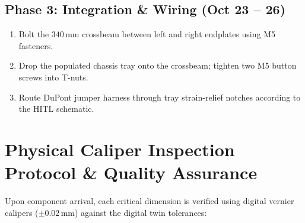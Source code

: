 \documentclass[10pt,a4paper]{article}
\begin{document}
\subsection{Phase 3: Integration \& Wiring (Oct 23 -- 26)}
\begin{enumerate}[leftmargin=*]
    \item Bolt the $340\,\text{mm}$ crossbeam between left and right endplates using M5 fasteners.
    \item Drop the populated chassis tray onto the crossbeam; tighten two M5 button screws into T-nuts.
    \item Route DuPont jumper harness through tray strain-relief notches according to the HITL schematic.
\end{enumerate}

\clearpage

\section{Physical Caliper Inspection Protocol \& Quality Assurance}

Upon component arrival, each critical dimension is verified using digital vernier calipers ($\pm 0.02\,\text{mm}$) against the digital twin tolerances:
\end{document}
